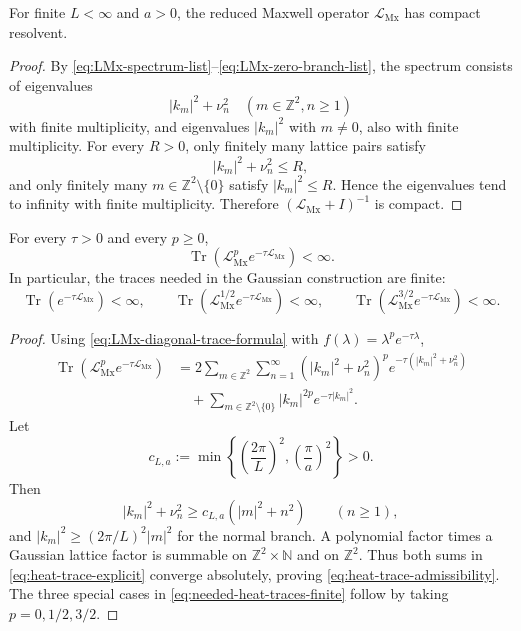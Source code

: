 \documentclass[11pt]{article}
\providecommand{\Z}{\mathbb{Z}}
\providecommand{\N}{\mathbb{N}}
\providecommand{\Tr}{\operatorname{Tr}}
\providecommand{\abs}[1]{\left\lvert #1\right\rvert}
\providecommand{\set}[1]{\left\{#1\right\}}
\providecommand{\paren}[1]{\left(#1\right)}
\providecommand{\LMx}{\mathcal L_{\mathrm{Mx}}}
\numberwithin{equation}{section}
\begin{document}
\begin{proposition}
\label{prop:compact-resolvent-LMx}
For finite \(L<\infty\) and \(a>0\), the reduced Maxwell operator \(\LMx\) has compact resolvent.
\end{proposition}

\begin{proof}
By \eqref{eq:LMx-spectrum-list}--\eqref{eq:LMx-zero-branch-list}, the spectrum consists of eigenvalues
\[
    \abs{k_m}^2+\nu_n^2
    \quad(m\in\Z^2,n\ge1)
\]
with finite multiplicity, and eigenvalues \(\abs{k_m}^2\) with \(m\ne0\), also with finite multiplicity.  For every \(R>0\), only finitely many lattice pairs satisfy
\[
    \abs{k_m}^2+\nu_n^2\le R,
\]
and only finitely many \(m\in\Z^2\setminus\{0\}\) satisfy \(\abs{k_m}^2\le R\).  Hence the eigenvalues tend to infinity with finite multiplicity.  Therefore \((\LMx+I)^{-1}\) is compact.
\end{proof}

\begin{proposition}
\label{prop:heat-trace-admissibility}
For every \(\tau>0\) and every \(p\ge0\),
\begin{equation}
\label{eq:heat-trace-admissibility}
    \Tr\paren{\LMx^p e^{-\tau\LMx}}<\infty .
\end{equation}
In particular, the traces needed in the Gaussian construction are finite:
\begin{equation}
\label{eq:needed-heat-traces-finite}
    \Tr(e^{-\tau\LMx})<\infty,
    \qquad
    \Tr\paren{\LMx^{1/2}e^{-\tau\LMx}}<\infty,
    \qquad
    \Tr\paren{\LMx^{3/2}e^{-\tau\LMx}}<\infty .
\end{equation}
\end{proposition}

\begin{proof}
Using \eqref{eq:LMx-diagonal-trace-formula} with \(f(\lambda)=\lambda^p e^{-\tau\lambda}\),
\begin{align}
\label{eq:heat-trace-explicit}
    \Tr\paren{\LMx^p e^{-\tau\LMx}}
    &=
    2\sum_{m\in\Z^2}\sum_{n=1}^{\infty}
    \paren{\abs{k_m}^2+\nu_n^2}^p
    e^{-\tau(\abs{k_m}^2+\nu_n^2)}
    \\
    &\quad+
    \sum_{m\in\Z^2\setminus\{0\}}
    \abs{k_m}^{2p}e^{-\tau\abs{k_m}^2} .\nonumber
\end{align}
Let
\[
    c_{L,a}:=\min\set{\paren{\frac{2\pi}{L}}^2,\paren{\frac{\pi}{a}}^2}>0 .
\]
Then
\[
    \abs{k_m}^2+\nu_n^2
    \ge c_{L,a}\paren{\abs{m}^2+n^2}
    \qquad(n\ge1),
\]
and \(\abs{k_m}^2\ge (2\pi/L)^2\abs{m}^2\) for the normal branch.  A polynomial factor times a Gaussian lattice factor is summable on \(\Z^2\times\N\) and on \(\Z^2\).  Thus both sums in \eqref{eq:heat-trace-explicit} converge absolutely, proving \eqref{eq:heat-trace-admissibility}.  The three special cases in \eqref{eq:needed-heat-traces-finite} follow by taking \(p=0,1/2,3/2\).
\end{proof}
\end{document}
